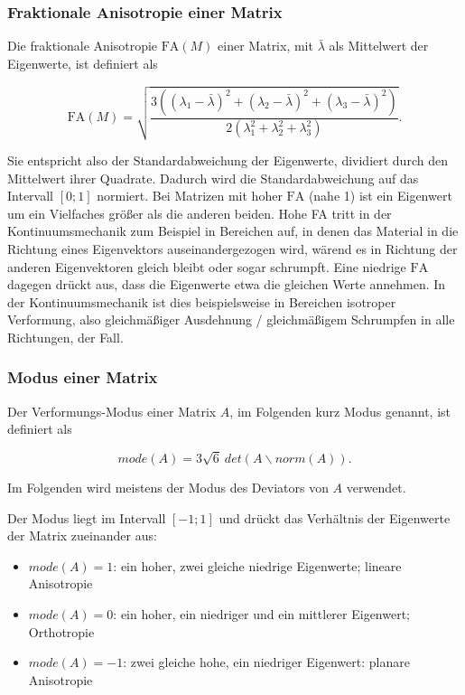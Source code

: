 \documentclass[a4paper,fontsize=12pt,toc=bib,halfparskip]{scrartcl}
\begin{document}
\subsubsection{Fraktionale Anisotropie einer Matrix}
Die fraktionale Anisotropie $\text{FA}(M)$ einer Matrix, mit $\bar{\lambda}$ als Mittelwert der Eigenwerte, ist definiert als

\begin{equation}
	\text{FA}(M) = \sqrt{\frac{3((\lambda_1 - \bar{\lambda})^2 + (\lambda_2 - \bar{\lambda})^2 + (\lambda_3 - \bar{\lambda})^2)}{2(\lambda_1^2 + \lambda_2^2 + \lambda_3^2)}}.
\end{equation}

Sie entspricht also der Standardabweichung der Eigenwerte, dividiert durch den Mittelwert ihrer Quadrate. Dadurch wird die Standardabweichung auf das Intervall $[0;1]$ normiert. Bei Matrizen mit hoher $\text{FA}$ (nahe 1) ist ein Eigenwert um ein Vielfaches gr\"o{\ss}er als die anderen beiden. Hohe FA tritt in der Kontinuumsmechanik zum Beispiel in Bereichen auf, in denen das Material in die Richtung eines Eigenvektors auseinandergezogen wird, w\"arend es in Richtung der anderen Eigenvektoren gleich bleibt oder sogar schrumpft. Eine niedrige $\text{FA}$ dagegen dr\"uckt aus, dass die Eigenwerte etwa die gleichen Werte annehmen. In der Kontinuumsmechanik ist dies beispielsweise in Bereichen isotroper Verformung, also gleichm\"a{\ss}iger Ausdehnung / gleichm\"a{\ss}igem Schrumpfen in alle Richtungen, der Fall.

\subsubsection{Modus einer Matrix}
Der Verformungs-Modus \cite{criscione2000invariant} einer Matrix $A$, im Folgenden kurz Modus genannt, ist definiert als

\begin{equation}
	mode(A) = 3\sqrt{6}~det(A\backslash norm(A)).
\end{equation}

Im Folgenden wird meistens der Modus des Deviators von $A$ verwendet.

Der Modus liegt im Intervall $[-1;1]$ und dr\"uckt das Verh\"altnis der Eigenwerte der Matrix zueinander aus:

\begin{itemize}
	\item $mode(A) = 1$: ein hoher, zwei gleiche niedrige Eigenwerte; lineare Anisotropie
	\item $mode(A) = 0$: ein hoher, ein niedriger und ein mittlerer Eigenwert; Orthotropie
	\item $mode(A) = -1$: zwei gleiche hohe, ein niedriger Eigenwert: planare Anisotropie
\end{itemize} 
\end{document}
